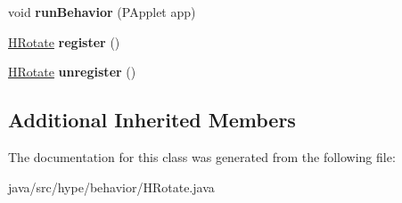 \begin{DoxyCompactItemize}
\item 
\hypertarget{classhype_1_1behavior_1_1_h_rotate_ac4a2819434de5dd46a504daa1091690a}{void {\bfseries run\-Behavior} (P\-Applet app)}\label{classhype_1_1behavior_1_1_h_rotate_ac4a2819434de5dd46a504daa1091690a}

\item 
\hypertarget{classhype_1_1behavior_1_1_h_rotate_a6eb051237ab08371594724ecce89d813}{\hyperlink{classhype_1_1behavior_1_1_h_rotate}{H\-Rotate} {\bfseries register} ()}\label{classhype_1_1behavior_1_1_h_rotate_a6eb051237ab08371594724ecce89d813}

\item 
\hypertarget{classhype_1_1behavior_1_1_h_rotate_a0ff42539a4246ef9bc2235fc391d43b7}{\hyperlink{classhype_1_1behavior_1_1_h_rotate}{H\-Rotate} {\bfseries unregister} ()}\label{classhype_1_1behavior_1_1_h_rotate_a0ff42539a4246ef9bc2235fc391d43b7}

\end{DoxyCompactItemize}
\subsection*{Additional Inherited Members}


The documentation for this class was generated from the following file\-:\begin{DoxyCompactItemize}
\item 
java/src/hype/behavior/H\-Rotate.\-java\end{DoxyCompactItemize}
